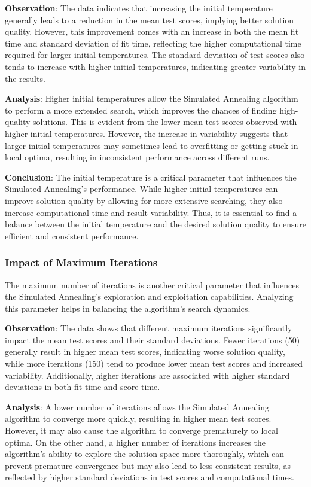 \documentclass[
]{article}
\begin{document}
    \textbf{Observation}: The data indicates that increasing the initial temperature generally leads to a reduction in the mean test scores, implying better solution quality. However, this improvement comes with an increase in both the mean fit time and standard deviation of fit time, reflecting the higher computational time required for larger initial temperatures. The standard deviation of test scores also tends to increase with higher initial temperatures, indicating greater variability in the results.

    \textbf{Analysis}: Higher initial temperatures allow the Simulated Annealing algorithm to perform a more extended search, which improves the chances of finding high-quality solutions. This is evident from the lower mean test scores observed with higher initial temperatures. However, the increase in variability suggests that larger initial temperatures may sometimes lead to overfitting or getting stuck in local optima, resulting in inconsistent performance across different runs.

    \textbf{Conclusion}: The initial temperature is a critical parameter that influences the Simulated Annealing's performance. While higher initial temperatures can improve solution quality by allowing for more extensive searching, they also increase computational time and result variability. Thus, it is essential to find a balance between the initial temperature and the desired solution quality to ensure efficient and consistent performance.

    \subsubsection{Impact of Maximum Iterations}

    The maximum number of iterations is another critical parameter that influences the Simulated Annealing’s exploration and exploitation capabilities. Analyzing this parameter helps in balancing the algorithm’s search dynamics.

    \textbf{Observation}: The data shows that different maximum iterations significantly impact the mean test scores and their standard deviations. Fewer iterations (50) generally result in higher mean test scores, indicating worse solution quality, while more iterations (150) tend to produce lower mean test scores and increased variability. Additionally, higher iterations are associated with higher standard deviations in both fit time and score time.

    \textbf{Analysis}: A lower number of iterations allows the Simulated Annealing algorithm to converge more quickly, resulting in higher mean test scores. However, it may also cause the algorithm to converge prematurely to local optima. On the other hand, a higher number of iterations increases the algorithm's ability to explore the solution space more thoroughly, which can prevent premature convergence but may also lead to less consistent results, as reflected by higher standard deviations in test scores and computational times.
\end{document}
